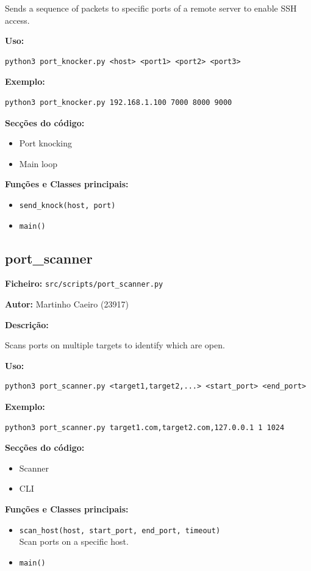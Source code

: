 \documentclass[a4paper,11pt]{article}
\begin{document}
Sends a sequence of packets to specific ports of a remote server to enable SSH access.

\textbf{Uso:}
\begin{verbatim}
python3 port_knocker.py <host> <port1> <port2> <port3>
\end{verbatim}

\textbf{Exemplo:}
\begin{verbatim}
python3 port_knocker.py 192.168.1.100 7000 8000 9000
\end{verbatim}

\textbf{Secções do código:}
\begin{itemize}
    \item Port knocking
    \item Main loop
\end{itemize}

\textbf{Funções e Classes principais:}
\begin{itemize}
    \item \texttt{send\_knock(host, port)}
    \item \texttt{main()}
\end{itemize}

\newpage
\subsection{port\_scanner}
\label{sec:port_scanner}

\textbf{Ficheiro:} \texttt{src/scripts/port\_scanner.py}

\textbf{Autor:} Martinho Caeiro (23917)

\textbf{Descrição:}

Scans ports on multiple targets to identify which are open.

\textbf{Uso:}
\begin{verbatim}
python3 port_scanner.py <target1,target2,...> <start_port> <end_port>
\end{verbatim}

\textbf{Exemplo:}
\begin{verbatim}
python3 port_scanner.py target1.com,target2.com,127.0.0.1 1 1024
\end{verbatim}

\textbf{Secções do código:}
\begin{itemize}
    \item Scanner
    \item CLI
\end{itemize}

\textbf{Funções e Classes principais:}
\begin{itemize}
    \item \texttt{scan\_host(host, start\_port, end\_port, timeout)}
    \\ Scan ports on a specific host.
    \item \texttt{main()}
\end{itemize}
\end{document}
